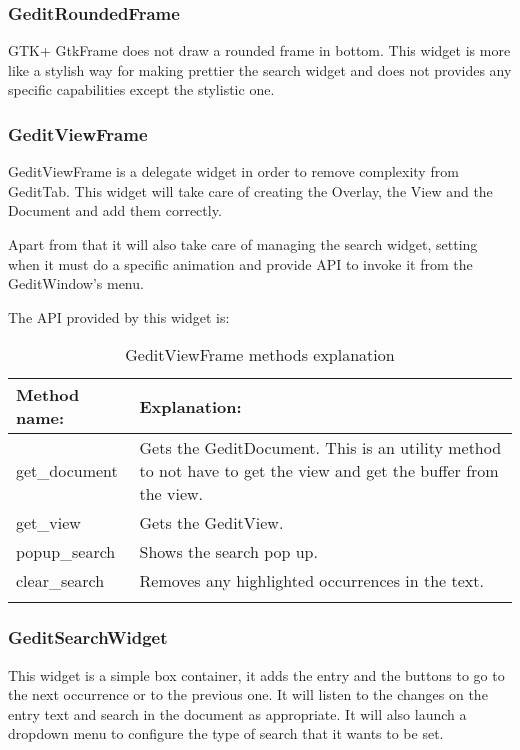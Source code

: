 \subsubsection{GeditRoundedFrame}

GTK+ GtkFrame does not draw a rounded frame in bottom. This widget is more like a stylish way for making prettier the search widget and does not provides any specific capabilities except the stylistic one.

\subsubsection{GeditViewFrame}

GeditViewFrame is a delegate widget in order to remove complexity from GeditTab. This widget will take care of creating the Overlay, the View and the Document and add them correctly.

Apart from that it will also take care of managing the search widget, setting when it must do a specific animation and provide API to invoke it from the GeditWindow's menu.

The API provided by this widget is:

\begin{table}[H]
  \begin{center}
    \begin{tabularx}{\textwidth}{|X|X|}
      \firsthline
      \textbf{Method name:} & \textbf{Explanation:} \\
      \hline
      get\_document & Gets the GeditDocument. This is an utility method to not have to get the view and get the buffer from the view. \\
      \hline
      get\_view & Gets the GeditView. \\
      \hline
      popup\_search & Shows the search pop up. \\
      \hline
      clear\_search & Removes any highlighted occurrences in the text. \\
      \lasthline
    \end{tabularx}
    \caption{GeditViewFrame methods explanation}
  \end{center}
\end{table}

\subsubsection{GeditSearchWidget}

This widget is a simple box container, it adds the entry and the buttons to go to the next occurrence or to the previous one. It will listen to the changes on the entry text and search in the document as appropriate. It will also launch a dropdown menu to configure the type of search that it wants to be set.

